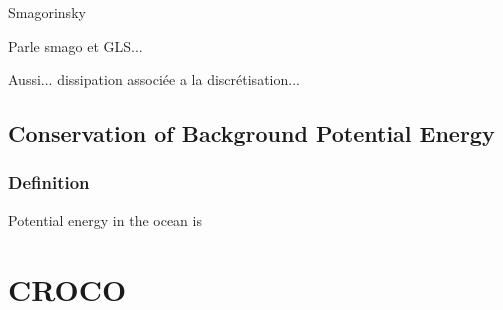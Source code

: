 Smagorinsky 

Parle smago et GLS...

Aussi... dissipation associée a la discrétisation...


\subsection{Conservation of Background Potential Energy}

\subsubsection{Definition}
Potential energy in the ocean is 

\subsubsection{}



\section{CROCO}



